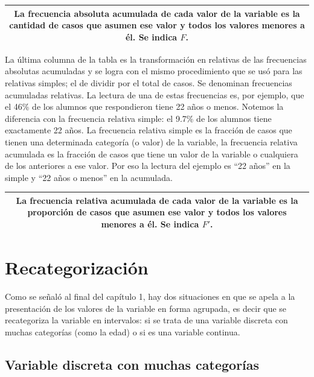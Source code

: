 \documentclass[]{book}
\begin{document}
\begin{longtable}[]{@{}c@{}}
\toprule
\endhead
\begin{minipage}[t]{0.97\columnwidth}\centering
La \textbf{frecuencia absoluta acumulada} de cada valor de la variable es la cantidad de casos que asumen ese valor y todos los valores menores a él. Se indica \(F\).\strut
\end{minipage}\tabularnewline
\bottomrule
\end{longtable}

La última columna de la tabla es la transformación en relativas de las frecuencias absolutas acumuladas y se logra con el mismo procedimiento que se usó para las relativas simples; el de dividir por el total de casos. Se denominan frecuencias acumuladas relativas. La lectura de una de estas frecuencias es, por ejemplo, que el 46\% de los alumnos que respondieron tiene 22 años o menos. Notemos la diferencia con la frecuencia relativa simple: el 9.7\% de los alumnos tiene exactamente 22 años. La frecuencia relativa simple es la fracción de casos que tienen una determinada categoría (o valor) de la variable, la frecuencia relativa acumulada es la fracción de casos que tiene un valor de la variable o cualquiera de los anteriores a ese valor. Por eso la lectura del ejemplo es ``22 años'' en la simple y ``22 años o menos'' en la acumulada.

\begin{longtable}[]{@{}c@{}}
\toprule
\endhead
\begin{minipage}[t]{0.97\columnwidth}\centering
La \textbf{frecuencia relativa acumulada} de cada valor de la variable es la proporción de casos que asumen ese valor y todos los valores menores a él. Se indica \(F'\).\strut
\end{minipage}\tabularnewline
\bottomrule
\end{longtable}

\hypertarget{recategorizacion}{%
\section{Recategorización}\label{recategorizacion}}

Como se señaló al final del capítulo 1, hay dos situaciones en que se apela a la presentación de los valores de la variable en forma agrupada, es decir que se recategoriza la variable en intervalos: si se trata de una variable discreta con muchas categorías (como la edad) o si es una variable continua.

\hypertarget{variable-discreta-con-muchas-categorias}{%
\subsection{Variable discreta con muchas categorías}\label{variable-discreta-con-muchas-categorias}}
\end{document}
